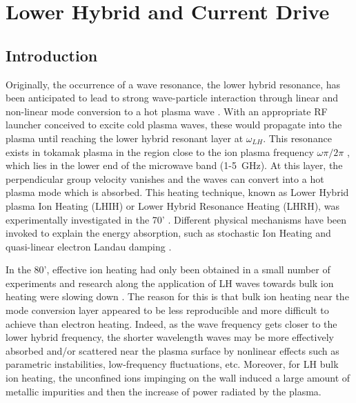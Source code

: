\chapter{Lower Hybrid and Current Drive}


\section{Introduction}
Originally, the occurrence of a wave resonance, the lower hybrid resonance, has been anticipated to lead to strong wave-particle interaction through linear and non-linear mode conversion to a hot plasma wave \cite{Stix1992}. With an appropriate RF launcher conceived to excite cold plasma waves, these would propagate into the plasma until reaching the lower hybrid resonant layer at $\omega_{LH}$. This resonance exists in tokamak plasma in the region close to the ion plasma frequency $\omega \pi/2\pi$ , which lies in the lower end of the microwave band (1-5 GHz). At this layer, the perpendicular group velocity vanishes and the waves can convert into a hot plasma mode which is absorbed. This heating technique, known as Lower Hybrid plasma Ion Heating (LHIH) or Lower Hybrid Resonance Heating (LHRH), was experimentally investigated in the 70' \cite{Bellan1974, Hooke1972, Golant1972, Tonon1977, Schuss1981}. Different physical mechanisms have been invoked to explain the energy absorption, such as stochastic Ion Heating\cite{Karney1977,Karney1978b,Karney1979b} and quasi-linear electron Landau damping \cite{Brambilla1983, Fisch1978, Karney1979}.

In the 80', effective ion heating had only been obtained in a small number of experiments and research along the application of LH waves towards bulk ion heating were slowing down \cite{Gormezano1986, Porkolab1984a, Tonon1984}. The reason for this is that bulk ion heating near the mode conversion layer appeared to be less reproducible and more difficult to achieve than electron heating. Indeed, as the wave frequency gets closer to the lower hybrid frequency, the shorter wavelength waves may be more effectively absorbed and/or scattered near the plasma surface by nonlinear effects such as parametric instabilities, low-frequency fluctuations, etc. Moreover, for LH bulk ion heating, the unconfined ions impinging on the wall induced a large amount of metallic impurities and then the increase of power radiated by the plasma.

